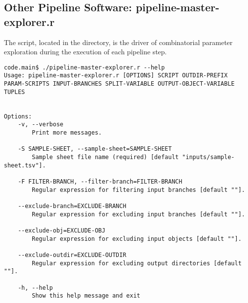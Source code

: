 \subsection[pipeline-master-explorer]{Other Pipeline Software: pipeline-master-explorer.r}\label{pipeline-master-explorer}%
The  script, located in the  directory, is the driver of combinatorial parameter exploration during the execution of each pipeline step. 
\begin{lstlisting}
code.main$ ./pipeline-master-explorer.r --help
Usage: pipeline-master-explorer.r [OPTIONS] SCRIPT OUTDIR-PREFIX PARAM-SCRIPTS INPUT-BRANCHES SPLIT-VARIABLE OUTPUT-OBJECT-VARIABLE TUPLES


Options:
	-v, --verbose
		Print more messages.

	-S SAMPLE-SHEET, --sample-sheet=SAMPLE-SHEET
		Sample sheet file name (required) [default "inputs/sample-sheet.tsv"].

	-F FILTER-BRANCH, --filter-branch=FILTER-BRANCH
		Regular expression for filtering input branches [default ""].

	--exclude-branch=EXCLUDE-BRANCH
		Regular expression for excluding input branches [default ""].

	--exclude-obj=EXCLUDE-OBJ
		Regular expression for excluding input objects [default ""].

	--exclude-outdir=EXCLUDE-OUTDIR
		Regular expression for excluding output directories [default ""].

	-h, --help
		Show this help message and exit
\end{lstlisting}
%
